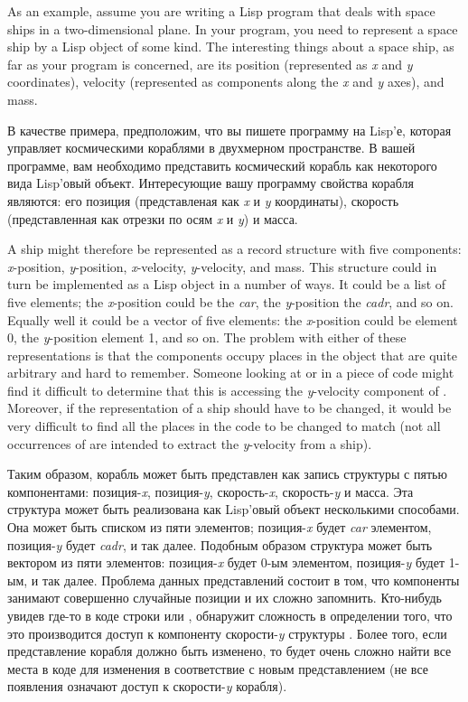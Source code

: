 As an example, assume you are writing a Lisp
program that deals with space ships in a two-dimensional plane.
In your program, you need to
represent a space ship by a Lisp object of some kind.  The interesting
things about a space ship, as far as your program is concerned, are
its position (represented as \emph{x} and \emph{y} coordinates),
velocity (represented as components along the \emph{x} and \emph{y} axes), and
mass.

В качестве примера, предположим, что вы пишете программу на Lisp'е, которая
управляет космическими кораблями в двухмерном пространстве.
В вашей программе, вам необходимо представить космический корабль как некоторого
вида Lisp'овый объект. Интересующие вашу программу свойства корабля являются: его
позиция (представленая как \emph{x} и \emph{y} координаты), скорость
(представленная как отрезки по осям \emph{x} и \emph{y}) и масса.

A ship might therefore be represented as a record structure with five
components: \emph{x}-position, \emph{y}-position, \emph{x}-velocity, \emph{y}-velocity, and mass.
This structure could in turn be implemented as a Lisp object in a
number of ways.  It could be a list of five elements; the \emph{x}-position
could be the \emph{car}, the \emph{y}-position the \emph{cadr}, and so on.  Equally
well it could be a vector of five elements: the \emph{x}-position could be
element 0, the \emph{y}-position element 1, and so on.  The problem with either
of these representations is that the components occupy places in the
object that are quite arbitrary and hard to remember.  Someone looking at
 or  in a piece of code might
find it difficult to determine that this is accessing the \emph{y}-velocity
component of .  Moreover, if the representation of a ship should
have to be changed, it would be very difficult to find all the places
in the code to be changed to match (not all occurrences of 
are intended to extract the \emph{y}-velocity from a ship).

Таким образом, корабль может быть представлен как запись структуры с пятью
компонентами: позиция-\emph{x}, позиция-\emph{y}, скорость-\emph{x},
скорость-\emph{y} и масса.
Эта структура может быть реализована как Lisp'овый объект несколькими способами.
Она может быть списком из пяти элементов; позиция-\emph{x} будет \emph{car}
элементом, позиция-\emph{y} будет \emph{cadr}, и так далее. Подобным образом
структура может быть вектором из пяти элементов: позиция-\emph{x} будет 0-ым
элементом, позиция-\emph{y} будет 1-ым, и так далее. Проблема данных
представлений состоит в том, что компоненты занимают совершенно случайные
позиции и их сложно запомнить. Кто-нибудь увидев где-то в коде
строки  или , обнаружит сложность в
определении того, что это производится доступ к компоненту скорости-\emph{y}
структуры . Более того, если представление корабля должно быть
изменено, то будет очень сложно найти все места в коде для изменения в
соответствие с новым представлением (не все появления  означают
доступ к скорости-\emph{y} корабля). 


